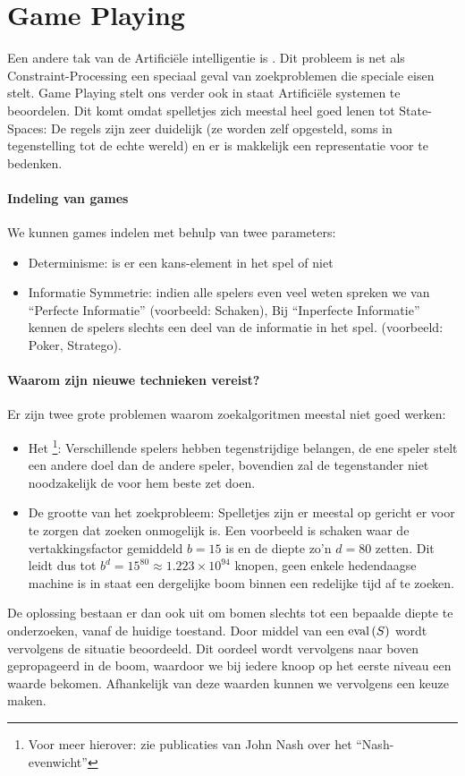 \section{Game Playing}
\label{s:gamePlaying}
Een andere tak van de Artifici\"ele intelligentie is . Dit probleem is net als Constraint-Processing een speciaal geval van zoekproblemen die speciale eisen stelt. Game Playing stelt ons verder ook in staat Artifici\"ele systemen te beoordelen. Dit komt omdat spelletjes zich meestal heel goed lenen tot State-Spaces: De regels zijn zeer duidelijk (ze worden zelf opgesteld, soms in tegenstelling tot de echte wereld) en er is makkelijk een representatie voor te bedenken.
\paragraph{Indeling van games}
We kunnen games indelen met behulp van twee parameters:
\begin{itemize}
 \item Determinisme: is er een kans-element in het spel of niet
 \item Informatie Symmetrie: indien alle spelers even veel weten spreken we van ``Perfecte Informatie'' (voorbeeld: Schaken), Bij ``Inperfecte Informatie'' kennen de spelers slechts een deel van de informatie in het spel. (voorbeeld: Poker, Stratego).
\end{itemize}
\paragraph{Waarom zijn nieuwe technieken vereist?}
Er zijn twee grote problemen waarom zoekalgoritmen meestal niet goed werken:
\begin{itemize}
 \item Het \footnote{Voor meer hierover: zie publicaties van John Nash over het ``Nash-evenwicht''}: Verschillende spelers hebben tegenstrijdige belangen, de ene speler stelt een andere doel dan de andere speler, bovendien zal de tegenstander niet noodzakelijk de voor hem beste zet doen.
 \item De grootte van het zoekprobleem: Spelletjes zijn er meestal op gericht er voor te zorgen dat zoeken onmogelijk is. Een voorbeeld is schaken waar de vertakkingsfactor gemiddeld $b=15$ is en de diepte zo'n $d=80$ zetten. Dit leidt dus tot $b^d=15^{80}\approx1.223\times10^{94}$ knopen, geen enkele hedendaagse machine is in staat een dergelijke boom binnen een redelijke tijd af te zoeken.
\end{itemize}
De oplossing bestaan er dan ook uit om bomen slechts tot een bepaalde diepte te onderzoeken, vanaf de huidige toestand. Door middel van een  $\mbox{eval}\left( S \right)$ wordt vervolgens de situatie beoordeeld. Dit oordeel wordt vervolgens naar boven gepropageerd in de boom, waardoor we bij iedere knoop op het eerste niveau een waarde bekomen. Afhankelijk van deze waarden kunnen we vervolgens een keuze maken.
